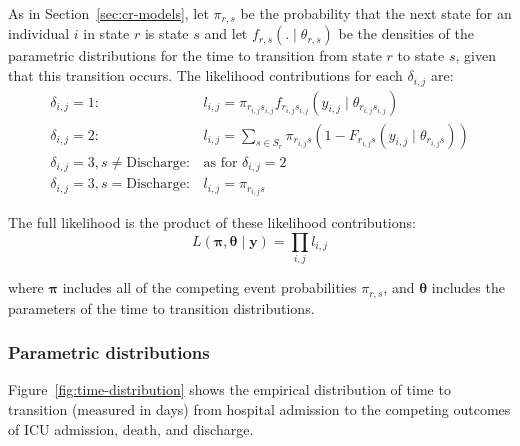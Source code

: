 As in Section~\ref{sec:cr-models}, let $\pi_{r,s}$ be the probability that the next state for an individual $i$ in state $r$ is state $s$ and let $f_{r,s}(. \mid \theta_{r,s})$ be the densities of the parametric distributions for the time to transition from state $r$ to state $s$, given that this transition occurs. The likelihood contributions for each $\delta_{i,j}$ are:
%
\[
    \begin{array}{rl}
        \delta_{i,j}=1 :                         & l_{i,j}=\pi_{r_{i,j}s_{i,j}}f_{r_{i,j}s_{i,j}}(y_{i,j} \mid \theta_{r_{i,j}s_{i,j}})               \\
        \delta_{i,j}=2 :                         & l_{i,j}=\sum_{s\in S_{r}}\pi_{r_{i,j}s}\left(1-F_{r_{i,j}s}(y_{i,j} \mid \theta_{r_{i,j}s})\right) \\
        \delta_{i,j}=3, s \neq \text{Discharge}: & \text{as for } \delta_{i,j}=2                                                                      \\
        \delta_{i,j}=3, s = \text{Discharge}:    & l_{i,j}=\pi_{r_{i,j}s}
    \end{array}
\]

The full likelihood is the product of these likelihood contributions:
%
\[
    L(\bm{\pi}, \bm{\theta} \mid \bm{y}) = \prod_{i,j}l_{i,j}
\]

where $\bm{\pi}$ includes all of the competing event probabilities $\pi_{r,s}$, and $\bm{\theta}$ includes the parameters of the time to transition distributions.

\subsubsection{Parametric distributions}

Figure~\ref{fig:time-distribution} shows the empirical distribution of time to transition (measured in days) from hospital admission to the competing outcomes of ICU admission, death, and discharge.

